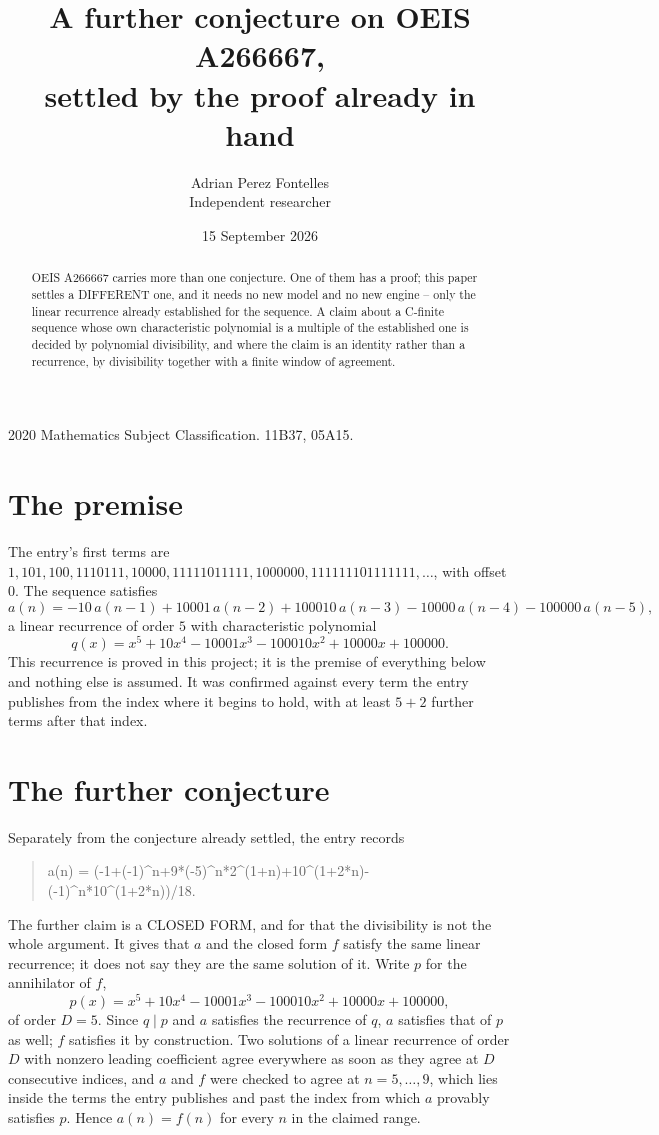 \documentclass[11pt,a4paper]{article}
\title{A further conjecture on OEIS A266667,\\ \large settled by the proof already in hand}
\author{Adrian Perez Fontelles\\ \small Independent researcher}
\date{15 September 2026}
\theoremstyle{plain}
\theoremstyle{definition}
\begin{document}
\maketitle

\begin{abstract}
OEIS A266667 carries more than one conjecture. One of them has a proof; this paper settles a
DIFFERENT one, and it needs no new model and no new engine -- only the linear recurrence already
established for the sequence. A claim about a C-finite sequence whose own characteristic
polynomial is a multiple of the established one is decided by polynomial divisibility, and where
the claim is an identity rather than a recurrence, by divisibility together with a finite window
of agreement.
\end{abstract}

\noindent\small 2020 Mathematics Subject Classification. 11B37, 05A15.\normalsize

\section{The premise}

The entry's first terms are $1, 101, 100, 1110111, 10000, 11111011111, 1000000, 111111101111111,\dots$, with offset $0$. The sequence satisfies
\[
  a(n)=-10\,a(n-1) + 10001\,a(n-2) + 100010\,a(n-3) - 10000\,a(n-4) - 100000\,a(n-5) ,
\]
a linear recurrence of order $5$ with characteristic polynomial
\[
  q(x)=x^{5} + 10 x^{4} - 10001 x^{3} - 100010 x^{2} + 10000 x + 100000 .
\]
This recurrence is proved in this project; it is the premise of everything below and nothing else is assumed.
It was confirmed against every term the entry publishes from the index where it begins to hold,
with at least $5+2$ further terms after that index.

\section{The further conjecture}

Separately from the conjecture already settled, the entry records

\begin{quote}\raggedright a(n) = (-1+(-1)\^{}n+9*(-5)\^{}n*2\^{}(1+n)+10\^{}(1+2*n)-(-1)\^{}n*10\^{}(1+2*n))/18.\end{quote}

The further claim is a CLOSED FORM, and for that the divisibility is not the whole argument. It
gives that $a$ and the closed form $f$ satisfy the same linear recurrence; it does not say they
are the same solution of it. Write $p$ for the annihilator of $f$,
\[
  p(x)=x^{5} + 10 x^{4} - 10001 x^{3} - 100010 x^{2} + 10000 x + 100000 ,
\]
of order $D=5$. Since $q\mid p$ and $a$ satisfies the recurrence of $q$, $a$ satisfies that of
$p$ as well; $f$ satisfies it by construction. Two solutions of a linear recurrence of order $D$
with nonzero leading coefficient agree everywhere as soon as they agree at $D$ consecutive
indices, and $a$ and $f$ were checked to agree at $n=5,\dots,9$,
which lies inside the terms the entry publishes and past the index from which $a$ provably
satisfies $p$. Hence $a(n)=f(n)$ for every $n$ in the claimed range.
\end{document}
